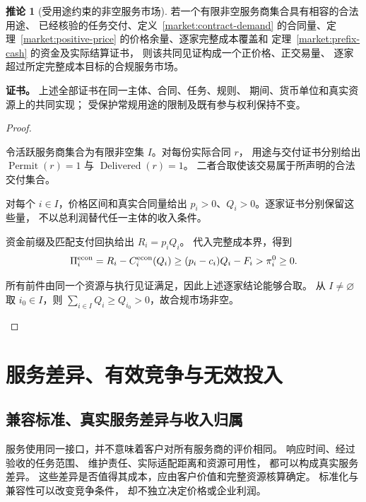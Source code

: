 \documentclass[UTF8,12pt,a4paper,openany,fontset=none,zihao=false]{ctexrep}
\theoremstyle{definition}
\newtheorem{corollary}{推论}[chapter]
\newenvironment{certificate}{\par\noindent\textbf{证书。}\ignorespaces}{\par}
\newcommand{\1}{\mathbf 1}
\begin{document}
\begin{corollary}[受用途约束的非空服务市场]
\label{market:nonempty}
若一个有限非空服务商集合具有相容的合法用途、
已经核验的任务交付、定义~\ref{market:contract-demand}
的合同量、定理~\ref{market:positive-price}
的价格余量、逐家完整成本覆盖和
定理~\ref{market:prefix-cash} 的资金及实际结算证书，
则该共同见证构成一个正价格、正交易量、
逐家超过所定完整成本目标的合规服务市场。
\end{corollary}
\begin{certificate}
上述全部证书在同一主体、合同、任务、规则、
期间、货币单位和真实资源上的共同实现；
受保护常规用途的限制及既有参与权利保持不变。
\end{certificate}
\begin{proof}
\begin{semanticsteps}
\item 令活跃服务商集合为有限非空集 \(I\)。对每份实际合同 \(r\)，
用途与交付证书分别给出
\(\operatorname{Permit}(r)=1\) 与 \(\operatorname{Delivered}(r)=1\)。
二者合取使该交易属于所声明的合法交付集合。
\item 对每个 \(i\in I\)，价格区间和真实合同量给出
\(p_i>0\)、\(Q_i>0\)。逐家证书分别保留这些量，
不以总利润替代任一主体的收入条件。
\item 资金前缀及匹配支付回执给出 \(R_i=p_iQ_i\)。
代入完整成本界，得到
\[
\Pi_i^{\rm econ}=R_i-C_i^{\rm econ}(Q_i)
\ge(p_i-c_i)Q_i-F_i>\pi_i^0\ge0.
\]
\item 所有前件由同一个资源与执行见证满足，因此上述逐家结论能够合取。
从 \(I\ne\varnothing\) 取 \(i_0\in I\)，则
\(\sum_{i\in I}Q_i\ge Q_{i_0}>0\)，故合规市场非空。
\end{semanticsteps}
\end{proof}


\chapter{服务差异、有效竞争与无效投入}
\label{integrated:competition}
\label{comp:chapter}

\section{兼容标准、真实服务差异与收入归属}

服务使用同一接口，并不意味着客户对所有服务商的评价相同。
响应时间、经过验收的任务范围、
维护责任、实际适配距离和资源可用性，
都可以构成真实服务差异。
这些差异是否值得其成本，应由客户价值和完整资源核算确定。
标准化与兼容性可以改变竞争条件，
却不独立决定价格或企业利润\cite{KatzShapiro1994}。
\end{document}
